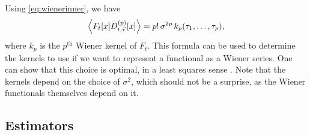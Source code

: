\documentclass[12pt]{article}
\theoremstyle{slplain}
\theoremstyle{sldefinition}
\theoremstyle{remark}
\begin{document}
Using \eqref{eq:wienerinner}, we have
%
\begin{equation}\label{eq:wienerkern}
  \left\langle F_t[x] D^{(p)}_{t,\vec{\tau}}[x] \right\rangle = p!\,\sigma^{2p}\,k_p(\tau_1,\ldots,\tau_p),
\end{equation}
%
where $k_p$ is the $p^{\text{th}}$ Wiener kernel of $F_t$. This formula can be used to determine the kernels to use if we want to represent a functional as a Wiener series. One can show that this choice is optimal, in a least squares sense \cite[\S15.2]{schetzen:1980}. Note that the kernels depend on the choice of $\sigma^2$, which should not be a surprise, as the Wiener functionals themselves depend on it.

\subsection{Estimators}\label{sec:wienerest}
\end{document}
